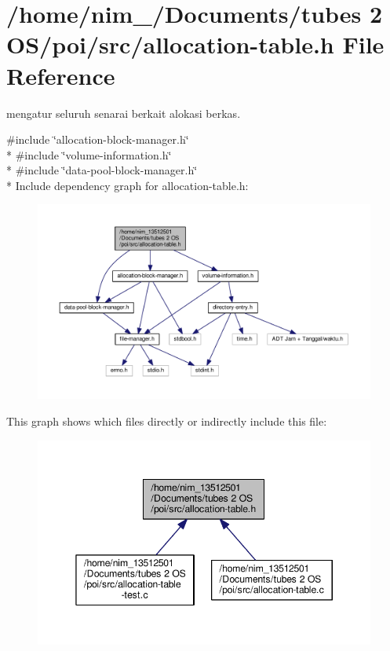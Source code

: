 \hypertarget{allocation-table_8h}{\section{/home/nim\-\_/\-Documents/tubes 2 O\-S/poi/src/allocation-\/table.h File Reference}
\label{allocation-table_8h}
}


mengatur seluruh senarai berkait alokasi berkas.  


{\ttfamily \#include \char`\"{}allocation-\/block-\/manager.\-h\char`\"{}}\\*
{\ttfamily \#include \char`\"{}volume-\/information.\-h\char`\"{}}\\*
{\ttfamily \#include \char`\"{}data-\/pool-\/block-\/manager.\-h\char`\"{}}\\*
Include dependency graph for allocation-\/table.h\-:\nopagebreak
\begin{figure}[H]
\begin{center}
\leavevmode
\includegraphics[width=350pt]{allocation-table_8h__incl}
\end{center}
\end{figure}
This graph shows which files directly or indirectly include this file\-:\nopagebreak
\begin{figure}[H]
\begin{center}
\leavevmode
\includegraphics[width=345pt]{allocation-table_8h__dep__incl}
\end{center}
\end{figure}
